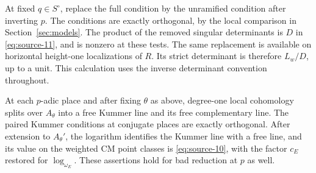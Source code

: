 At fixed \(q\in S^\circ\), replace the full condition by the
unramified condition after inverting \(p\).  The conditions are
exactly orthogonal, by the local comparison in
Section~\ref{sec:models}.  The product of the removed singular
determinants is \(D\) in \eqref{eq:source-11}, and is nonzero at
these tests.  The same replacement is available on horizontal
height-one localizations of \(R\).  Its strict determinant is
therefore \(L_w/D\), up to a unit.  This calculation uses the inverse
determinant convention throughout.

\begin{lemma}\label{pair:local-lines}
At each \(p\)-adic place and after fixing \(\theta\) as above,
degree-one local cohomology splits over \(A_\theta\) into a free
Kummer line and its
free complementary line.  The paired Kummer conditions at conjugate
places are exactly orthogonal.  After extension to \(A_\theta'\),
the logarithm identifies the Kummer line with a free line, and its
value on the weighted CM point classes is
\eqref{eq:source-10}, with the factor \(c_E\) restored for
\(\log_{\omega_E}\).  These assertions hold for bad reduction at
\(p\) as well.
\end{lemma}

